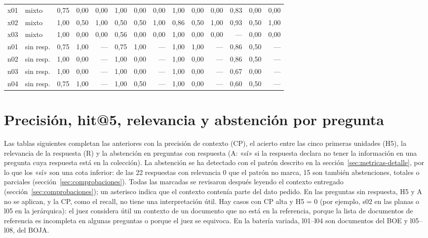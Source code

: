 \begin{footnotesize}
\begin{longtable}{@{}l l rrr rrr rrr rrr@{}}
x01 & mixto & 0,75 & 0,00 & 0,00 & 1,00 & 0,00 & 0,00 & 1,00 & 0,00 & 0,00 & 0,83 & 0,00 & 0,00 \\
x02 & mixto & 1,00 & 0,50 & 1,00 & 0,50 & 0,50 & 1,00 & 0,86 & 0,50 & 1,00 & 0,93 & 0,50 & 1,00 \\
x03 & mixto & 1,00 & 0,00 & 0,00 & 0,56 & 0,00 & 0,00 & 1,00 & 0,00 & 0,00 & --- & 0,00 & 0,00 \\
n01 & sin resp. & 0,75 & 1,00 & --- & 0,75 & 1,00 & --- & 1,00 & 1,00 & --- & 0,86 & 0,50 & --- \\
n02 & sin resp. & 1,00 & 0,00 & --- & 1,00 & 0,00 & --- & 1,00 & 0,00 & --- & 0,86 & 0,50 & --- \\
n03 & sin resp. & 1,00 & 0,00 & --- & 1,00 & 0,00 & --- & 1,00 & 0,00 & --- & 0,67 & 0,00 & --- \\
n04 & sin resp. & 0,75 & 1,00 & --- & 1,00 & 0,50 & --- & 1,00 & 0,00 & --- & 0,60 & 0,50 & --- \\
\bottomrule
\end{longtable}
\end{footnotesize}

\section{Precisión, hit@5, relevancia y abstención por pregunta}
\label{sec:ap-detalle}

Las tablas siguientes completan las anteriores con la precisión de contexto (CP), el acierto entre las cinco primeras unidades (H5), la relevancia de la respuesta (R) y la abstención en preguntas con respuesta (A: «sí» si la respuesta declara no tener la información en una pregunta cuya respuesta está en la colección). La abstención se ha detectado con el patrón descrito en la sección~\ref{sec:metricas-detalle}, por lo que los «sí» son una cota inferior: de las 22 respuestas con relevancia 0 que el patrón no marca, 15 son también abstenciones, totales o parciales (sección~\ref{sec:comprobaciones}). Todas las marcadas se revisaron después leyendo el contexto entregado (sección~\ref{sec:comprobaciones}); un asterisco indica que el contexto contenía parte del dato pedido. En las preguntas sin respuesta, H5 y A no se aplican, y la CP, como el recall, no tiene una interpretación útil. Hay casos con CP alta y H5 = 0 (por ejemplo, s02 en las planas o l05 en la jerárquica): el juez considera útil un contexto de un documento que no está en la referencia, porque la lista de documentos de referencia es incompleta en algunas preguntas o porque el juez se equivoca. En la batería variada, l01--l04 son documentos del BOE y l05--l08, del BOJA.

